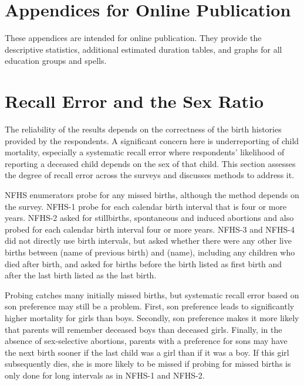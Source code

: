 \documentclass[12pt,letterpaper]{article}
\begin{document}



\clearpage
\newpage

\appendix

\renewcommand\thefigure{\thesection.\arabic{figure}}    
\renewcommand\thetable{\thesection.\arabic{table}}    

\section*{Appendices for Online Publication}

These appendices are intended for online publication.
They provide the descriptive statistics, additional
estimated duration tables, and graphs for all 
education groups and spells.


\clearpage
\newpage

\section{Recall Error and the Sex Ratio}

\setcounter{figure}{0}
\setcounter{table}{0}

The reliability of the results depends on the correctness of the birth histories
provided by the respondents.
A significant concern here is underreporting of child mortality, especially a systematic
recall error where respondents' likelihood of reporting a deceased child depends on the 
sex of that child. 
This section assesses the degree of recall error across the surveys and discusses methods
to address it.

NFHS enumerators probe for any missed births, although the method depends on the survey.
NFHS-1 probe for each calendar birth interval that is four or more years.
NFHS-2 asked for stillbirths, spontaneous and induced abortions and also probed 
for each calendar birth interval four or more years.
NFHS-3 and NFHS-4 did not directly use birth intervals, but asked whether there were any 
other live births between (name of previous birth) and (name), including any children who 
died after birth, and asked for births before the birth listed as first birth and
after the last birth listed as the last birth.

Probing catches many initially missed births, but systematic recall error based on son
preference may still be a problem.
First, son preference leads to significantly higher mortality for girls than boys.
Secondly, son preference makes it more likely that parents will remember deceased boys 
than deceased girls.
Finally, in the absence of sex-selective abortions, parents with a preference for sons may
have the next birth sooner if the last child was a girl than if it was a boy.
If this girl subsequently dies, she is more likely to be missed if probing for missed 
births is only done for long intervals as in NFHS-1 and NFHS-2.
\end{document}
